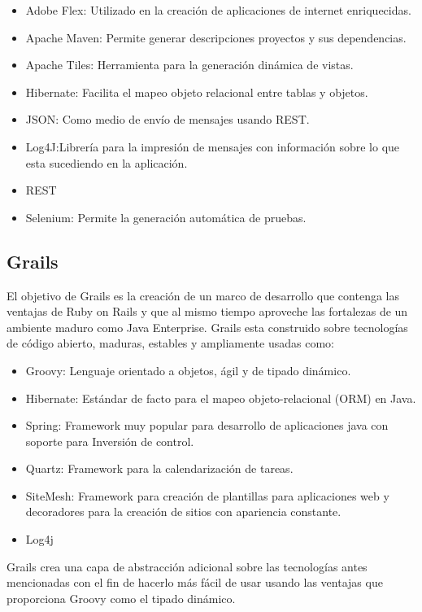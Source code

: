 \documentclass[12pt,a4paper,spanish,openany]{book}
\begin{document}
\begin{itemize}
    \item   Adobe Flex: Utilizado en la creación de aplicaciones de internet
    enriquecidas.
    \item   Apache Maven: Permite generar descripciones proyectos y sus
    dependencias.
    \item   Apache Tiles: Herramienta para la generación dinámica de vistas. 
    \item   Hibernate: Facilita el mapeo objeto relacional entre tablas y
    objetos.
    \item   JSON: Como medio de envío de mensajes usando REST. 
    \item   Log4J:Librería para la impresión de mensajes con información sobre lo
  que esta sucediendo en la aplicación.
    \item   REST
    \item   Selenium: Permite la generación automática de pruebas.
\end{itemize}




\subsection{Grails}


El objetivo de Grails es la creación de un marco de desarrollo que contenga las
ventajas de Ruby on Rails y que al mismo tiempo aproveche las fortalezas de
un ambiente maduro como Java Enterprise. Grails esta construido sobre
tecnologías de código abierto, maduras, estables y ampliamente usadas como:
\begin{itemize}
  \item Groovy: Lenguaje orientado a objetos, ágil y de tipado dinámico.
  \item Hibernate: Estándar de facto para el mapeo objeto-relacional (ORM) en
  Java.
  \item Spring: Framework muy popular para desarrollo de aplicaciones java
  con soporte para Inversión de control.
  \item Quartz: Framework para la   calendarización de tareas.
  \item SiteMesh: Framework para creación de plantillas para aplicaciones web y
  decoradores para la creación de sitios con apariencia constante.
  \item Log4j
\end{itemize}


Grails crea una capa de abstracción adicional sobre las tecnologías antes
mencionadas con el fin de hacerlo más fácil de usar usando las ventajas que
proporciona Groovy como el tipado dinámico.
\end{document}
